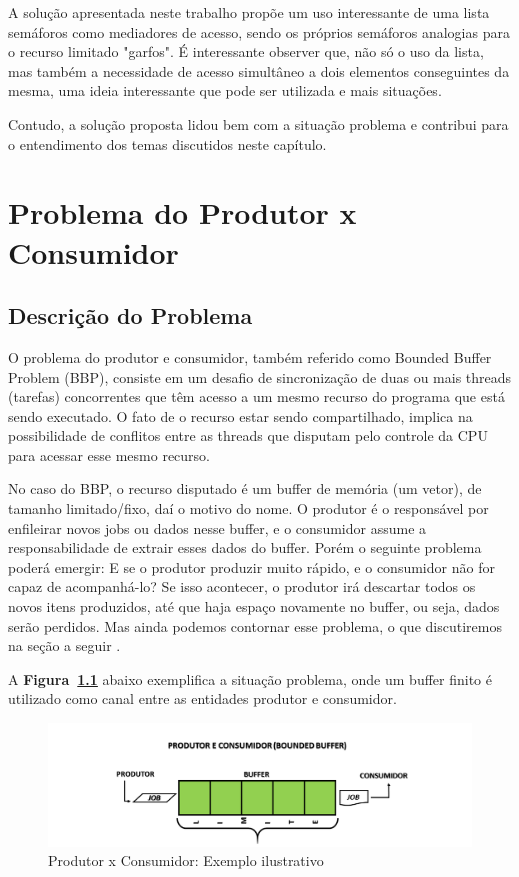 \documentclass[
	12pt,				%
	openright,			%
	oneside,			%
	a4paper,			%
	chapter=TITLE,		%
	english,			%
	french,				%
	spanish,			%
	brazil				%
	]{abntex2}
\theoremstyle{definition}
\begin{document}
A solução apresentada neste trabalho propõe um uso interessante de uma lista semáforos como mediadores de acesso, sendo os próprios semáforos analogias para o recurso limitado "garfos". É interessante observer que, não só o uso da lista, mas também a necessidade de acesso simultâneo a dois elementos conseguintes da mesma, uma ideia interessante que pode ser utilizada e mais situações.

Contudo, a solução proposta lidou bem com a situação problema e contribui para o entendimento dos temas discutidos neste capítulo.

\chapter{Problema do Produtor x Consumidor}
\section{Descrição do Problema}
O problema do produtor e consumidor, também referido como Bounded Buffer Problem (BBP), consiste em um desafio de sincronização de duas ou mais threads (tarefas) concorrentes que têm acesso a um mesmo recurso do programa que está sendo executado. O fato de o recurso estar sendo compartilhado, implica na possibilidade de conflitos entre as threads que disputam pelo controle da CPU para acessar esse mesmo recurso.

No caso do BBP, o recurso disputado é um buffer de memória (um vetor), de tamanho limitado/fixo, daí o motivo do nome. O produtor é o responsável por enfileirar novos jobs ou dados nesse buffer, e o consumidor assume a responsabilidade de extrair esses dados do buffer. Porém o seguinte problema poderá emergir: E se o produtor produzir muito rápido, e o consumidor não for capaz de acompanhá-lo? Se isso acontecer, o produtor irá descartar todos os novos itens produzidos, até que haja espaço novamente no buffer, ou seja, dados serão perdidos. Mas ainda podemos contornar esse problema, o que discutiremos na seção a seguir \cite{produtor-consumidor}.

A \textbf{Figura~\ref{fig:ex_prod_cons}} abaixo exemplifica a situação problema, onde um buffer finito é utilizado como canal entre as entidades produtor e consumidor.

\begin{figure}[h]
    \centering
    \includegraphics[width=1.0\textwidth]{imagens/ex_prod_cons.png}
    \caption{Produtor x Consumidor: Exemplo ilustrativo}
    \label{fig:ex_prod_cons}
\end{figure}
\end{document}

